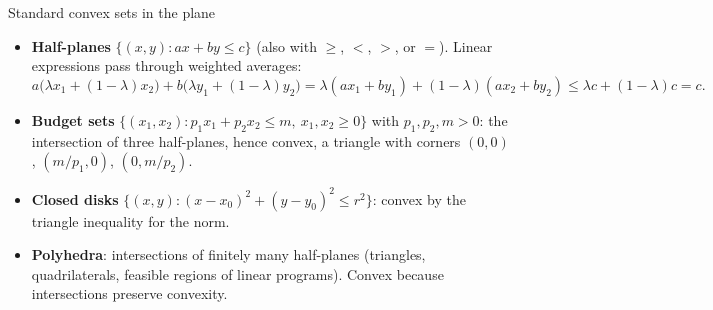 \begin{rulebox}{Standard convex sets in the plane}
\begin{itemize}[leftmargin=1.6em,itemsep=0.3ex]
  \item \textbf{Half-planes} $\{(x,y): ax+by\le c\}$ (also with $\ge$, $<$,
        $>$, or $=$). Linear expressions pass through weighted averages:
        \[
          a\bigl(\lambda x_{1}+(1-\lambda)x_{2}\bigr)
          +b\bigl(\lambda y_{1}+(1-\lambda)y_{2}\bigr)
          =\lambda(ax_{1}+by_{1})+(1-\lambda)(ax_{2}+by_{2})
          \le \lambda c+(1-\lambda)c=c .
        \]
  \item \textbf{Budget sets}
        $\{(x_{1},x_{2}): p_{1}x_{1}+p_{2}x_{2}\le m,\ x_{1},x_{2}\ge 0\}$
        with $p_{1},p_{2},m>0$: the intersection of three half-planes, hence
        convex, a triangle with corners $(0,0)$, $(m/p_{1},0)$,
        $(0,m/p_{2})$.
  \item \textbf{Closed disks} $\{(x,y): (x-x_{0})^{2}+(y-y_{0})^{2}\le
        r^{2}\}$: convex by the triangle inequality for the norm.
  \item \textbf{Polyhedra}: intersections of finitely many half-planes
        (triangles, quadrilaterals, feasible regions of linear programs).
        Convex because intersections preserve convexity.
\end{itemize}
\end{rulebox}

